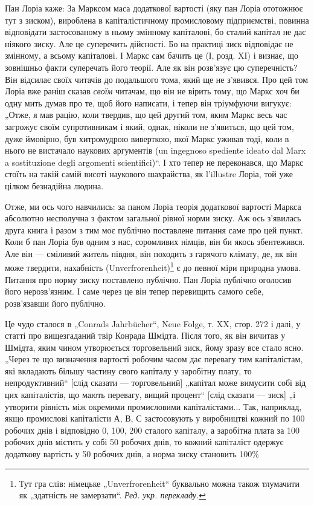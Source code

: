 Пан Лоріа каже: За Марксом маса додаткової вартості (яку
пан Лоріа ототожнює тут з зиском), вироблена в капіталістичному
промисловому підприємстві, повинна відповідати застосованому
в ньому змінному капіталові, бо сталий капітал не дає
ніякого зиску. Але це суперечить дійсності. Бо на практиці зиск
відповідає не змінному, а всьому капіталові. І Маркс сам бачить
це (І, розд. XI) і визнає, що зовнішньо факти суперечать
його теорії. Але як він розв’язує цю суперечність? Він відсилає
своїх читачів до подальшого тома, який ще не з’явився.
Про цей том Лоріа вже раніш сказав \emph{своїм} читачам, що він
не вірить тому, що Маркс хоч би одну мить думав про те,
щоб його написати, і тепер він тріумфуючи вигукує: „Отже,
я мав рацію, коли твердив, що цей другий том, яким Маркс
весь час загрожує своїм супротивникам і який, однак, ніколи
не з’явиться, що цей том, дуже ймовірно, був хитромудрою
виверткою, якої Маркс уживав тоді, коли в нього не
вистачало наукових аргументів (un ingegnoso spediente ideato
dal Marx a sostituzione degli argomenti scientifici)“. І хто тепер
не переконався, що Маркс стоїть на такій самій висоті наукового
шахрайства, як l'illustre Лоріа, той уже цілком безнадійна
людина.

Отже, ми ось чого навчились: за паном Лоріа теорія додаткової
вартості Маркса абсолютно несполучна з фактом загальної
рівної норми зиску. Аж ось з’явилась друга книга і разом
з тим моє публічно поставлене питання саме про цей пункт.
Коли б пан Лоріа був одним з нас, соромливих німців, він би
якось збентежився. Але він — сміливий житель півдня, він походить
з гарячого клімату, де, як він може твердити, нахабність
(Unverfrorenheit)\footnote*{Тут гра слів: німецьке „Unverfrorenheit“ буквально можна також тлумачити
як „здатність не замерзати“. \emph{Ред. укр. перекладу.}} є до певної міри природна умова. Питання
про норму зиску поставлено публічно. Пан Лоріа публічно оголосив
його нерозв’язним. І саме через це він тепер перевищить
самого себе, розв’язавши його публічно.

Це чудо сталося в „Conrads Jahrbücher“, Neue Folge, т. XX,
стор. 272 і далі, у статті про вищезгаданий твір Конрада Шмідта.
Після того, як він вичитав у Шмідта, яким чином утворюється
торговельний зиск, йому зразу все стало ясно. „Через те що
визначення вартості робочим часом дає перевагу тим капіталістам,
які вкладають більшу частину свого капіталу у заробітну
плату, то непродуктивний“ [слід сказати — торговельний] „капітал
може вимусити собі від цих капіталістів, що мають перевагу,
вищий процент“ [слід сказати — зиск] „і утворити рівність
між окремими промисловими капіталістами... Так, наприклад,
якщо промислові капіталісти А, В, С застосовують у виробництві
кожний по 100 робочих днів і відповідно 0, 100, 200
сталого капіталу, а заробітна плата за 100 робочих днів містить
у собі 50 робочих днів, то кожний капіталіст одержує додаткову
вартість у 50 робочих днів, а норма зиску становить 100\%
\parbreak{}  %
